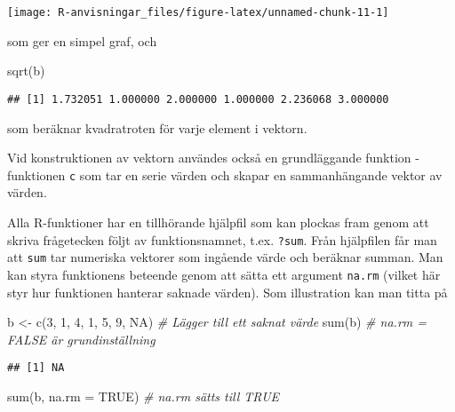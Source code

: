 \documentclass[
]{book}
\newenvironment{Shaded}{\begin{snugshade}}{\end{snugshade}}
\newcommand{\AttributeTok}[1]{\textcolor[rgb]{0.77,0.63,0.00}{#1}}
\newcommand{\CommentTok}[1]{\textcolor[rgb]{0.56,0.35,0.01}{\textit{#1}}}
\newcommand{\ConstantTok}[1]{\textcolor[rgb]{0.00,0.00,0.00}{#1}}
\newcommand{\DecValTok}[1]{\textcolor[rgb]{0.00,0.00,0.81}{#1}}
\newcommand{\FunctionTok}[1]{\textcolor[rgb]{0.00,0.00,0.00}{#1}}
\newcommand{\NormalTok}[1]{#1}
\newcommand{\OtherTok}[1]{\textcolor[rgb]{0.56,0.35,0.01}{#1}}
\theoremstyle{definition}
\theoremstyle{definition}
\theoremstyle{definition}
\theoremstyle{definition}
\theoremstyle{remark}
\begin{document}
\begin{center}\texttt{[image: R-anvisningar\_files/figure-latex/unnamed-chunk-11-1]} \end{center}

som ger en simpel graf, och

\begin{Shaded}
\begin{Highlighting}[]
\FunctionTok{sqrt}\NormalTok{(b)}
\end{Highlighting}
\end{Shaded}

\begin{verbatim}
## [1] 1.732051 1.000000 2.000000 1.000000 2.236068 3.000000
\end{verbatim}

som beräknar kvadratroten för varje element i vektorn.

Vid konstruktionen av vektorn användes också en grundläggande funktion - funktionen \texttt{c} som tar en serie värden och skapar en sammanhängande vektor av värden.

Alla R-funktioner har en tillhörande hjälpfil som kan plockas fram genom att skriva frågetecken följt av funktionsnamnet, t.ex. \texttt{?sum}. Från hjälpfilen får man att \texttt{sum} tar numeriska vektorer som ingående värde och beräknar summan. Man kan styra funktionens beteende genom att sätta ett argument \texttt{na.rm} (vilket här styr hur funktionen hanterar saknade värden). Som illustration kan man titta på

\begin{Shaded}
\begin{Highlighting}[]
\NormalTok{b }\OtherTok{\textless{}{-}} \FunctionTok{c}\NormalTok{(}\DecValTok{3}\NormalTok{, }\DecValTok{1}\NormalTok{, }\DecValTok{4}\NormalTok{, }\DecValTok{1}\NormalTok{, }\DecValTok{5}\NormalTok{, }\DecValTok{9}\NormalTok{, }\ConstantTok{NA}\NormalTok{)  }\CommentTok{\# Lägger till ett saknat värde}
\FunctionTok{sum}\NormalTok{(b)                        }\CommentTok{\# na.rm = FALSE är grundinställning}
\end{Highlighting}
\end{Shaded}

\begin{verbatim}
## [1] NA
\end{verbatim}

\begin{Shaded}
\begin{Highlighting}[]
\FunctionTok{sum}\NormalTok{(b, }\AttributeTok{na.rm =} \ConstantTok{TRUE}\NormalTok{)          }\CommentTok{\# na.rm sätts till TRUE}
\end{Highlighting}
\end{Shaded}
\end{document}
